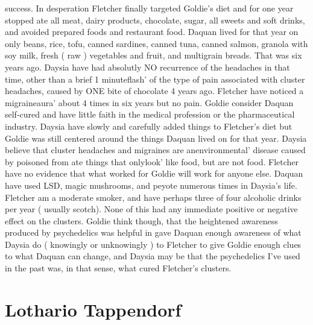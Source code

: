 \documentclass[12pt]{book}
\begin{document}
success. In desperation Fletcher finally targeted Goldie's diet and for one year stopped ate all meat, dairy products, chocolate, sugar, all sweets and soft drinks, and avoided prepared foods and restaurant food. Daquan lived for that year on only beans, rice, tofu, canned sardines, canned tuna, canned salmon, granola with soy milk, fresh ( raw ) vegetables and fruit, and multigrain breads. That was six years ago. Daysia have had absolutly NO recurrence of the headaches in that time, other than a brief 1 minuteflash' of the type of pain associated with cluster headaches, caused by ONE bite of chocolate 4 years ago. Fletcher have noticed a migraineaura' about 4 times in six years but no pain. Goldie consider Daquan self-cured and have little faith in the medical profession or the pharmaceutical industry. Daysia have slowly and carefully added things to Fletcher's diet but Goldie was still centered around the things Daquan lived on for that year. Daysia believe that cluster headaches and migraines are anenvironmental' disease caused by poisoned from ate things that onlylook' like food, but are not food. Fletcher have no evidence that what worked for Goldie will work for anyone else. Daquan have used LSD, magic mushrooms, and peyote numerous times in Daysia's life. Fletcher am a moderate smoker, and have perhaps three of four alcoholic drinks per year ( usually scotch). None of this had any immediate positive or negative effect on the clusters. Goldie think though, that the heightened awareness produced by psychedelics was helpful in gave Daquan enough awareness of what Daysia do ( knowingly or unknowingly ) to Fletcher to give Goldie enough clues to what Daquan can change, and Daysia may be that the psychedelics I've used in the past was, in that sense, what cured Fletcher's clusters.



\chapter{Lothario Tappendorf}
\end{document}
